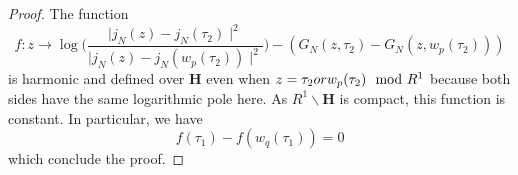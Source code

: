 \documentclass[10pt,a4paper]{amsart}
\begin{document}
\begin{proof}
    The function 
    \begin{equation}
        f:z\rightarrow \log\Biggl(\frac{\mid j_{N}(z)-j_{N}(\tau_2)\mid^2}{\mid j_{N}(z)-j_{N}(w_p(\tau_2))\mid^2}\Biggl)
        -(G_N(z,\tau_2)-G_N(z,w_p(\tau_2)))
    \end{equation}
is harmonic and defined over $\mathbf{H}$ even when $z=\tau_2 \textup{ or } w_p(\tau_2) \mod R^1$ because both sides have the same logarithmic pole here. As $R^1\backslash\mathbf{H}$ is compact, this function is constant. In particular, we have
\[f(\tau_1)-f(w_q(\tau_1))=0\] 
which conclude the proof.
\end{proof}
\end{document}
